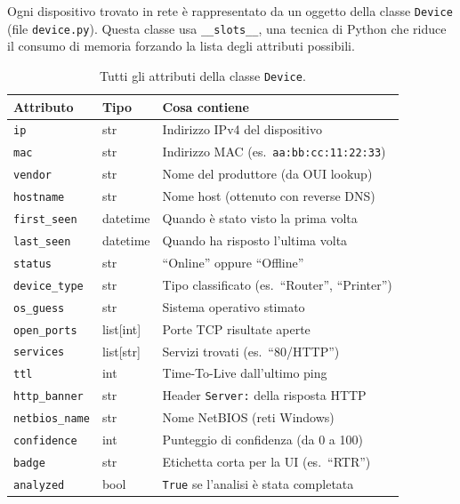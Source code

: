 \documentclass[a4paper,11pt]{article}
\begin{document}
Ogni dispositivo trovato in rete è rappresentato da un oggetto
della classe \texttt{Device} (file \texttt{device.py}).  Questa
classe usa \texttt{\_\_slots\_\_}, una tecnica di Python che
riduce il consumo di memoria forzando la lista degli attributi
possibili.

\begin{table}[H]
\centering
\small
\begin{tabularx}{\textwidth}{llX}
  \toprule
  \textbf{Attributo}    & \textbf{Tipo}   & \textbf{Cosa contiene} \\
  \midrule
  \texttt{ip}           & str             & Indirizzo IPv4 del dispositivo \\
  \texttt{mac}          & str             & Indirizzo MAC (es.\ \texttt{aa:bb:cc:11:22:33}) \\
  \texttt{vendor}       & str             & Nome del produttore (da OUI lookup) \\
  \texttt{hostname}     & str             & Nome host (ottenuto con reverse DNS) \\
  \texttt{first\_seen}  & datetime        & Quando è stato visto la prima volta \\
  \texttt{last\_seen}   & datetime        & Quando ha risposto l'ultima volta \\
  \texttt{status}       & str             & ``Online'' oppure ``Offline'' \\
  \texttt{device\_type} & str             & Tipo classificato (es.\ ``Router'', ``Printer'') \\
  \texttt{os\_guess}    & str             & Sistema operativo stimato \\
  \texttt{open\_ports}  & list[int]       & Porte TCP risultate aperte \\
  \texttt{services}     & list[str]       & Servizi trovati (es.\ ``80/HTTP'') \\
  \texttt{ttl}          & int             & Time-To-Live dall'ultimo ping \\
  \texttt{http\_banner} & str             & Header \texttt{Server:} della risposta HTTP \\
  \texttt{netbios\_name}& str             & Nome NetBIOS (reti Windows) \\
  \texttt{confidence}   & int             & Punteggio di confidenza (da 0 a 100) \\
  \texttt{badge}        & str             & Etichetta corta per la UI (es.\ ``RTR'') \\
  \texttt{analyzed}     & bool            & \texttt{True} se l'analisi è stata completata \\
  \bottomrule
\end{tabularx}
\caption{Tutti gli attributi della classe \texttt{Device}.}
\end{table}
\end{document}
